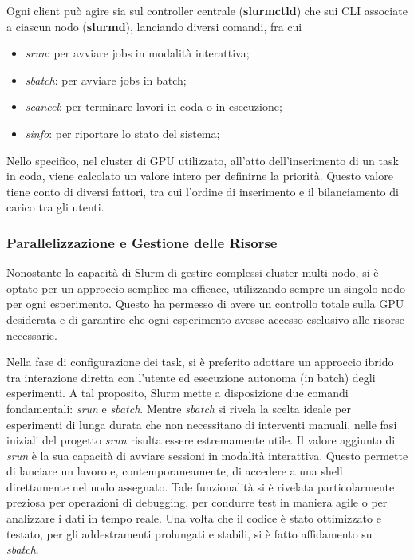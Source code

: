 \documentclass[12pt,a4paper,twoside,openright]{book}
\begin{document}
Ogni client può agire sia sul controller centrale (\textbf{slurmctld}) che sui CLI associate a ciascun nodo (\textbf{slurmd}), lanciando diversi comandi, fra cui
\begin{itemize}
    \item \emph{srun}: per avviare jobs in modalità interattiva;
    \item \emph{sbatch}: per avviare jobs in batch;
    \item \emph{scancel}: per terminare lavori in coda o in esecuzione;
    \item \emph{sinfo}: per riportare lo stato del sistema;
\end{itemize}

Nello specifico, nel cluster di GPU utilizzato, all'atto dell'inserimento di un task in coda, viene calcolato un valore intero per definirne la priorità. Questo valore tiene conto di diversi fattori, tra cui l'ordine di inserimento e il bilanciamento di carico tra gli utenti.

\subsubsection{Parallelizzazione e Gestione delle Risorse}
Nonostante la capacità di Slurm di gestire complessi cluster multi-nodo, si è optato per un approccio semplice ma efficace, utilizzando sempre un singolo nodo per ogni esperimento. Questo ha permesso di avere un controllo totale sulla GPU desiderata e di garantire che ogni esperimento avesse accesso esclusivo alle risorse necessarie.

Nella fase di configurazione dei task, si è preferito adottare un approccio ibrido tra interazione diretta con l'utente ed esecuzione autonoma (in batch) degli esperimenti. A tal proposito, Slurm mette a disposizione due comandi fondamentali: \emph{srun} e \emph{sbatch}. Mentre \emph{sbatch} si rivela la scelta ideale per esperimenti di lunga durata che non necessitano di interventi manuali, nelle fasi iniziali del progetto \emph{srun} risulta essere estremamente utile.
Il valore aggiunto di \emph{srun} è la sua capacità di avviare sessioni in modalità interattiva. Questo permette di lanciare un lavoro e, contemporaneamente, di accedere a una shell direttamente nel nodo assegnato. Tale funzionalità si è rivelata particolarmente preziosa per operazioni di debugging, per condurre test in maniera agile o per analizzare i dati in tempo reale. Una volta che il codice è stato ottimizzato e testato, per gli addestramenti prolungati e stabili, si è fatto affidamento su \emph{sbatch}.
\end{document}
